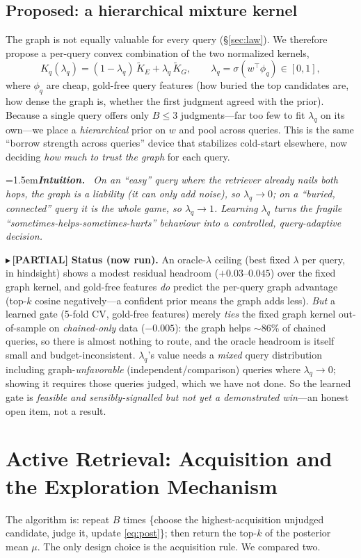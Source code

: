 \documentclass[11pt]{article}
\newcommand{\PARTIAL}[1]{{\color{orange}\small$\blacktriangleright$\,\textbf{[PARTIAL]} #1}}
\newenvironment{intuition}{\par\smallskip\noindent\hangindent=1.5em\textbf{\itshape Intuition.}\itshape\ \ignorespaces}{\par\smallskip}
\newcommand{\Kt}{\widetilde{K}}
\begin{document}
\subsection{Proposed: a hierarchical mixture kernel}\label{sec:mixture}
The graph is not equally valuable for every query (\S\ref{sec:law}). We therefore propose a per-query convex
combination of the two normalized kernels,
\begin{equation}\label{eq:mix}
  K_q(\lambda_q) = (1-\lambda_q)\,\Kt_E + \lambda_q\,\Kt_G, \qquad \lambda_q=\sigma(w^\top\phi_q)\in[0,1],
\end{equation}
where $\phi_q$ are cheap, gold-free query features (how buried the top candidates are, how dense the graph is,
whether the first judgment agreed with the prior). Because a single query offers only $B\le3$ judgments---far
too few to fit $\lambda_q$ on its own---we place a \emph{hierarchical} prior on $w$ and pool across queries.
This is the same ``borrow strength across queries'' device that stabilizes cold-start elsewhere, now deciding
\emph{how much to trust the graph} for each query.
\begin{intuition}
On an ``easy'' query where the retriever already nails both hops, the graph is a liability (it can only add
noise), so $\lambda_q\to0$; on a ``buried, connected'' query it is the whole game, so $\lambda_q\to1$. Learning
$\lambda_q$ turns the fragile ``sometimes-helps-sometimes-hurts'' behaviour into a controlled, query-adaptive
decision.
\end{intuition}
\PARTIAL{\textbf{Status (now run).} An oracle-$\lambda$ ceiling (best fixed $\lambda$ per query, in hindsight)
shows a modest residual headroom ($+0.03$--$0.045$) over the fixed graph kernel, and gold-free features \emph{do}
predict the per-query graph advantage (top-$k$ cosine negatively---a confident prior means the graph adds less).
\emph{But} a learned gate (5-fold CV, gold-free features) merely \emph{ties} the fixed graph kernel out-of-sample
on \emph{chained-only} data ($-0.005$): the graph helps $\sim$86\% of chained queries, so there is almost nothing
to route, and the oracle headroom is itself small and budget-inconsistent. $\lambda_q$'s value needs a
\emph{mixed} query distribution including graph-\emph{unfavorable} (independent/comparison) queries where
$\lambda_q\to0$; showing it requires those queries judged, which we have not done. So the learned gate is
\emph{feasible and sensibly-signalled but not yet a demonstrated win}---an honest open item, not a result.}

\section{Active Retrieval: Acquisition and the Exploration Mechanism}\label{sec:acq}
The algorithm is: repeat $B$ times \{choose the highest-acquisition unjudged candidate, judge it, update
\eqref{eq:post}\}; then return the top-$k$ of the posterior mean $\mu$. The only design choice is the
acquisition rule. We compared two.
\end{document}

